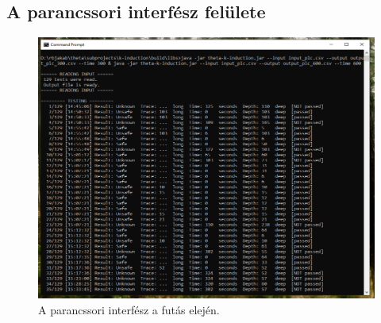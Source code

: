 \appendix
\chapter*{\fuggelek}
\setcounter{chapter}{\appendixnumber}

\section{A parancssori interfész felülete}
\label{sec:fuggelek}
\begin{figure}[!ht]
	\label{fig:cli_1cc}
	\centering
	\includegraphics[width=135mm, keepaspectratio]{figures/cli/eleje.png}
	\caption{A parancssori interfész a futás elején.} 
\end{figure}

